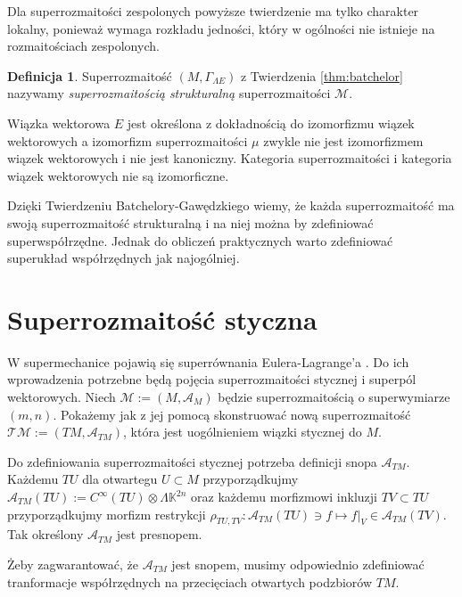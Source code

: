\documentclass[11pt,a4paper]{report}
\theoremstyle{definition}
\newtheorem{definition}[theorem]{Definicja}
\begin{document}
Dla superrozmaitości zespolonych powyższe twierdzenie ma tylko charakter lokalny, ponieważ wymaga rozkładu jedności, który w ogólności nie istnieje na rozmaitościach zespolonych.

\begin{definition}
Superrozmaitość $(M, \Gamma_{\Lambda E})$ z Twierdzenia \ref{thm:batchelor} nazywamy \textit{superrozmaitością strukturalną} superrozmaitości $\mathcal{M}$.
\end{definition}

Wiązka wektorowa $E$ jest określona z dokładnością do izomorfizmu wiązek wektorowych a izomorfizm superrozmaitości $\mu$ zwykle nie jest izomorfizmem wiązek wektorowych i nie jest kanoniczny. Kategoria superrozmaitości i kategoria wiązek wektorowych nie są izomorficzne.

Dzięki Twierdzeniu Batchelory-Gawędzkiego wiemy, że każda superrozmaitość ma swoją superrozmaitość strukturalną i na niej można by zdefiniować superwspółrzędne. Jednak do obliczeń praktycznych warto zdefiniować superukład współrzędnych jak najogólniej.

\section{Superrozmaitość styczna}

W supermechanice pojawią się superrównania Eulera-Lagrange'a \cite{carinena}. Do ich wprowadzenia potrzebne będą pojęcia superrozmaitości stycznej i superpól wektorowych. Niech $\mathcal{M} := (M, \mathcal{A}_M)$ będzie superrozmaitością o superwymiarze $(m,n)$. Pokażemy jak z jej pomocą skonstruować nową superrozmaitość $\mathcal{T} \mathcal{M} := (TM, \mathcal{A}_{TM})$, która jest uogólnieniem wiązki stycznej do $M$.

Do zdefiniowania superrozmaitości stycznej potrzeba definicji snopa $\mathcal{A}_{TM}$. Każdemu $TU$ dla otwartegu $U \subset M$ przyporządkujmy $\mathcal{A}_{TM}(TU) := C^\infty (TU) \otimes \Lambda \mathbb{K}^{2n}$ oraz każdemu morfizmowi inkluzji $TV \subset TU$ przyporządkujmy morfizm restrykcji $\rho_{TU,TV}: \mathcal{A}_{TM}(TU) \ni f \mapsto f|_{V} \in \mathcal{A}_{TM}(TV)$. Tak określony $\mathcal{A}_{TM}$ jest presnopem.

Żeby zagwarantować, że $\mathcal{A}_{TM}$ jest snopem, musimy odpowiednio zdefiniować tranformacje współrzędnych na przecięciach otwartych podzbiorów $TM$. 
\end{document}
